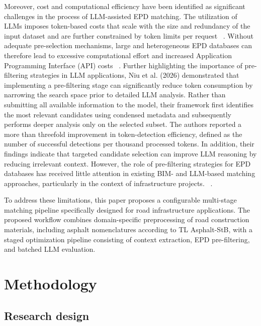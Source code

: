 \documentclass[10pt, a4paper, twocolumn]{article}
\begin{document}
Moreover, cost and computational efficiency have been identified as significant challenges in the process of LLM-assisted EPD matching. The utilization of LLMs imposes token-based costs that scale with the size and redundancy of the input dataset and are further constrained by token limits per request ~\cite{Petrosa.2025}. Without adequate pre-selection mechanisms, large and heterogeneous EPD databases can therefore lead to excessive computational effort and increased Application Programming Interface (API) costs  ~\cite{Petrosa.2025}. Further highlighting the importance of pre-filtering strategies in LLM applications, Niu et al. (2026) demonstrated that implementing a pre-filtering stage can significantly reduce token consumption by narrowing the search space prior to detailed LLM analysis. Rather than submitting all available information to the model, their framework first identifies the most relevant candidates using condensed metadata and subsequently performs deeper analysis only on the selected subset. The authors reported a more than threefold improvement in token-detection efficiency, defined as the number of successful detections per thousand processed tokens. In addition, their findings indicate that targeted candidate selection can improve LLM reasoning by reducing irrelevant context. However, the role of pre-filtering strategies for EPD databases has received little attention in existing BIM- and LLM-based matching approaches, particularly in the context of infrastructure projects. ~\cite{ Niu et al (2026)}.  

To address these limitations, this paper proposes a configurable multi-stage matching pipeline specifically designed for road infrastructure applications. The proposed workflow combines domain-specific preprocessing of road construction materials, including asphalt nomenclatures according to TL Asphalt-StB, with a staged optimization pipeline consisting of context extraction, EPD pre-filtering, and batched LLM evaluation.


\section{Methodology}

\subsection{Research design}
\end{document}
